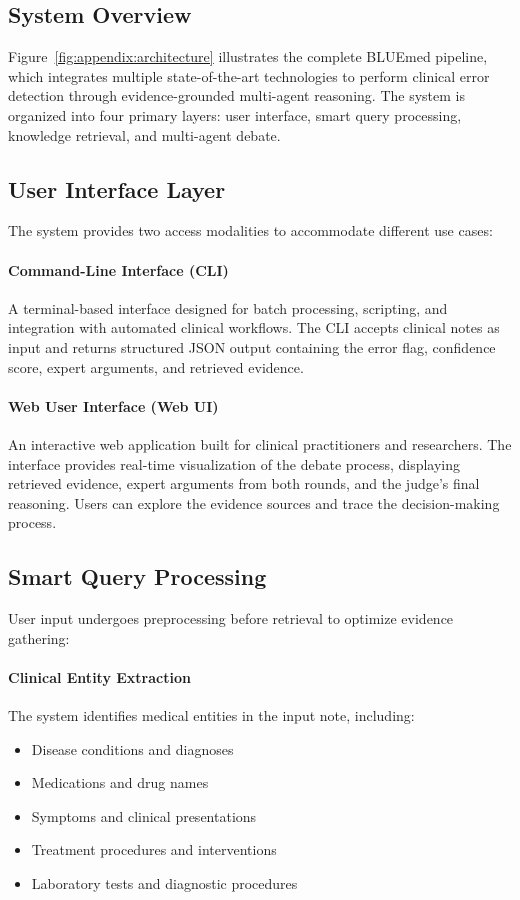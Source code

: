 \documentclass[11pt]{article}
\begin{document}
\subsection{System Overview}

Figure~\ref{fig:appendix:architecture} illustrates the complete BLUEmed pipeline, which integrates multiple state-of-the-art technologies to perform clinical error detection through evidence-grounded multi-agent reasoning. The system is organized into four primary layers: user interface, smart query processing, knowledge retrieval, and multi-agent debate.

\subsection{User Interface Layer}

The system provides two access modalities to accommodate different use cases:

\paragraph{Command-Line Interface (CLI)}
A terminal-based interface designed for batch processing, scripting, and integration with automated clinical workflows. The CLI accepts clinical notes as input and returns structured JSON output containing the error flag, confidence score, expert arguments, and retrieved evidence.

\paragraph{Web User Interface (Web UI)}
An interactive web application built for clinical practitioners and researchers. The interface provides real-time visualization of the debate process, displaying retrieved evidence, expert arguments from both rounds, and the judge's final reasoning. Users can explore the evidence sources and trace the decision-making process.

\subsection{Smart Query Processing}

User input undergoes preprocessing before retrieval to optimize evidence gathering:

\paragraph{Clinical Entity Extraction}
The system identifies medical entities in the input note, including:
\begin{itemize}
    \item Disease conditions and diagnoses
    \item Medications and drug names
    \item Symptoms and clinical presentations
    \item Treatment procedures and interventions
    \item Laboratory tests and diagnostic procedures
\end{itemize}
\end{document}

